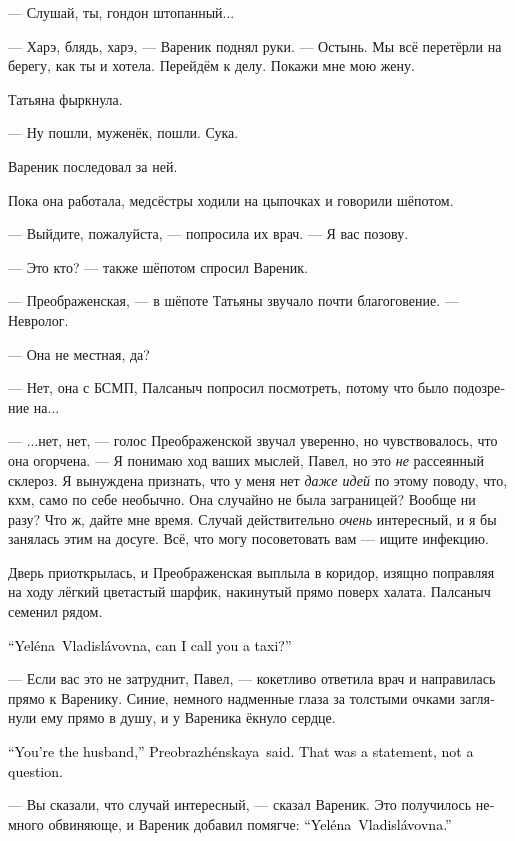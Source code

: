\documentclass[a5paper,12pt,fleqn]{extbook}\usepackage{cooltooltips}\usepackage{polyglossia}\setdefaultlanguage[babelshorthands=true]{russian}\setotherlanguage{english}\defaultfontfeatures{Ligatures=TeX,Mapping=tex-text} \usepackage{xcolor}\definecolor{lightgray}{HTML}{bbbbbb}\color{lightgray}\newcommand{\ml}[3]{\textenglish{\textcolor{black}{#3}}}
\newcommand{\asterism}{\vspace{1em}{\centering\Large\bfseries$\ast~\ast~\ast$\par}\vspace{1em}}
\newcommand{\textspace}{\vspace{1em}{\centering\Large\bfseries<...>\par}\vspace{1em}}
\newcommand{\Preobrazhenskaya}{Preobrazh\'enskaya}
\newcommand{\Yelena}{Yel\'ena}
\newcommand{\Vladislavovna}{Vladisl\'avovna}
\begin{document}
--- Слушай, ты, гондон штопанный...

--- Харэ, блядь, харэ, --- Вареник поднял руки.
--- Остынь.
Мы всё перетёрли на берегу, как ты и хотела.
Перейдём к делу.
Покажи мне мою жену.

Татьяна фыркнула.

--- Ну пошли, муженёк, пошли.
Сука.

Вареник последовал за ней.

\asterism

\textspace

Пока она работала, медсёстры ходили на цыпочках и говорили шёпотом.

--- Выйдите, пожалуйста, --- попросила их врач.
--- Я вас позову.

--- Это кто? --- также шёпотом спросил Вареник.

--- Преображенская, --- в шёпоте Татьяны звучало почти благоговение.
--- Невролог.

--- Она не местная, да?

--- Нет, она с БСМП, Палсаныч попросил посмотреть, потому что было подозрение на...

--- ...нет, нет, --- голос Преображенской звучал уверенно, но чувствовалось, что она огорчена.
--- Я понимаю ход ваших мыслей, Павел, но это \emph{не} рассеянный склероз.
Я вынуждена признать, что у меня нет \emph{даже идей} по этому поводу, что, кхм, само по себе необычно.
Она случайно не была заграницей?
Вообще ни разу?
Что ж, дайте мне время.
Случай действительно \emph{очень} интересный, и я бы занялась этим на досуге.
Всё, что могу посоветовать вам --- ищите инфекцию.

Дверь приоткрылась, и Преображенская выплыла в коридор, изящно поправляя на ходу лёгкий цветастый шарфик, накинутый прямо поверх халата.
Палсаныч семенил рядом.

\ml{$0$}
{--- Елена Владиславовна, вам такси вызвать?}
{``\Yelena\ \Vladislavovna, can I call you a taxi?''}

--- Если вас это не затруднит, Павел, --- кокетливо ответила врач и направилась прямо к Варенику.
Синие, немного надменные глаза за толстыми очками заглянули ему прямо в душу, и у Вареника ёкнуло сердце.

\ml{$0$}
{--- Вы муж, --- сказала Преображенская.}
{``You're the husband,'' \Preobrazhenskaya\ said.}
\ml{$0$}
{Это было утверждение, а не вопрос.}
{That was a statement, not a question.}

--- Вы сказали, что случай интересный, --- сказал Вареник.
Это получилось немного обвиняюще, и Вареник добавил помягче:
\ml{$0$}
{--- Елена Владиславовна.}
{``\Yelena\ \Vladislavovna.''}
\end{document}
